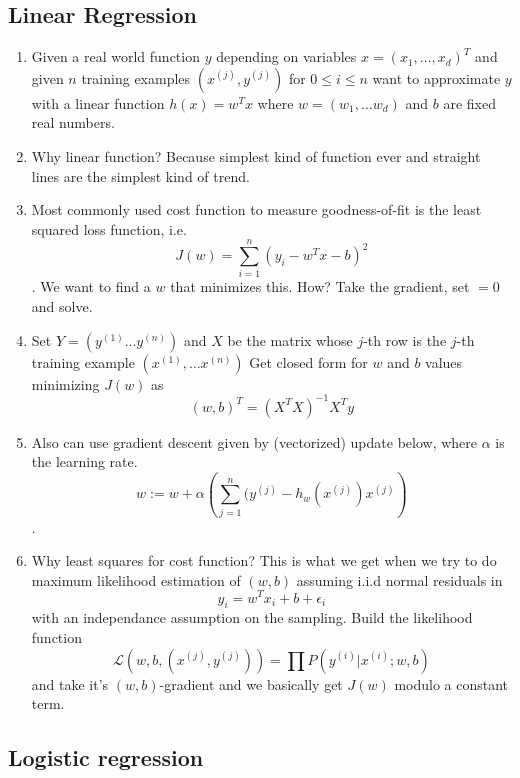 \documentclass[a4paper]{article}
\begin{document}
\subsection{Linear Regression}
\begin{enumerate}
    \item Given a real world function $y$ depending on variables $x=(x_1,\ldots, x_d)^T$ and given $n$ training examples $(x^(j), y^(j))$ for $0\leq i \leq n$  want to approximate $y$ with a linear function $h(x) = w^Tx$ where $w=(w_1,\ldots w_d)$ and $b$ are fixed real numbers. 
    \item Why linear function? Because simplest kind of function ever and straight lines are the simplest kind of trend.
    \item Most commonly used cost function to measure goodness-of-fit is the least squared loss function, i.e. $$J(w) = \sum_{i=1}^n (y_i-w^Tx-b)^2$$. We want to find a $w$ that minimizes this. How? Take the gradient, set $=0$ and solve. 
    \item Set $Y=(y^{(1)}\ldots y^{(n)})$ and $X$ be the matrix whose $j$-th row is the $j$-th training example $(x^{(1)},\ldots x^{(n)})$  Get closed form for $w$ and $b$ values minimizing $J(w)$ as $$(w,b)^T = (X^TX )^{-1}X^Ty$$
    
    \item Also can use gradient descent given by (vectorized) update below, where $\alpha $ is the learning rate.
    $$w:=w+\alpha\left(\sum_{j=1}^n(y^{(j)}-h_w(x^{(j)})x^{(j)}\right) $$.
    \item Why least squares for cost function? This is what we get when we try to do maximum likelihood estimation of $(w,b)$ assuming i.i.d normal residuals in $$ y_i = w^Tx_i +b+\epsilon_i$$ with an independance assumption on the sampling. Build the likelihood function $$\mathcal L(w,b, (x^{(j)},y^{(j)})) = \prod P(y^{(i)}|x^{(i)};w,b) $$
        and take it's $(w,b)$-gradient and we basically get $J(w)$ modulo a constant term.
\end{enumerate}
    
   
\subsection{Logistic regression}
\end{document}
